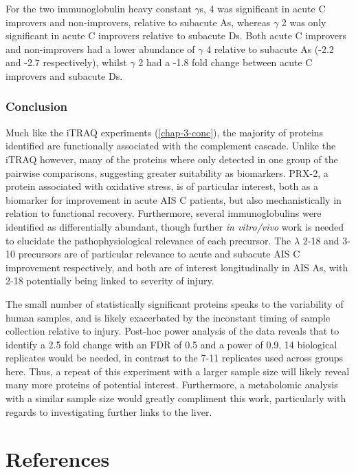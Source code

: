 \documentclass[9pt,lineno]{elife}
\begin{document}
For the two immunoglobulin heavy constant \(\gamma\)s, 4 was significant in acute C improvers and non-improvers, relative to subacute As, whereas \(\gamma\) 2 was only significant in acute C improvers relative to subacute Ds.
Both acute C improvers and non-improvers had a lower abundance of \(\gamma\) 4 relative to subacute As (-2.2 and -2.7 respectively), whilst \(\gamma\) 2 had a -1.8 fold change between acute C improvers and subacute Ds.

\hypertarget{chap4-conc}{%
\subsubsection{Conclusion}\label{chap4-conc}}

Much like the iTRAQ experiments (\ref{chap-3-conc}), the majority of proteins identified are functionally associated with the complement cascade.
Unlike the iTRAQ however, many of the proteins where only detected in one group of the pairwise comparisons, suggesting greater suitability as biomarkers.
PRX-2, a protein associated with oxidative stress, is of particular interest, both as a biomarker for improvement in acute AIS C patients, but also mechanistically in relation to functional recovery.
Furthermore, several immunoglobulins were identified as differentially abundant, though further \emph{in vitro/vivo} work is needed to elucidate the pathophysiological relevance of each precursor.
The \(\lambda\) 2-18 and 3-10 precursors are of particular relevance to acute and subacute AIS C improvement respectively, and both are of interest longitudinally in AIS As, with 2-18 potentially being linked to severity of injury.

The small number of statistically significant proteins speaks to the variability of human samples, and is likely exacerbated by the inconstant timing of sample collection relative to injury.
Post-hoc power analysis of the data reveals that to identify a 2.5 fold change with an FDR of 0.5 and a power of 0.9, 14 biological replicates would be needed, in contrast to the 7-11 replicates used across groups here.
Thus, a repeat of this experiment with a larger sample size will likely reveal many more proteins of potential interest.
Furthermore, a metabolomic analysis with a similar sample size would greatly compliment this work, particularly with regards to investigating further links to the liver.

\hypertarget{references}{%
\section*{References}\label{references}}
\end{document}
